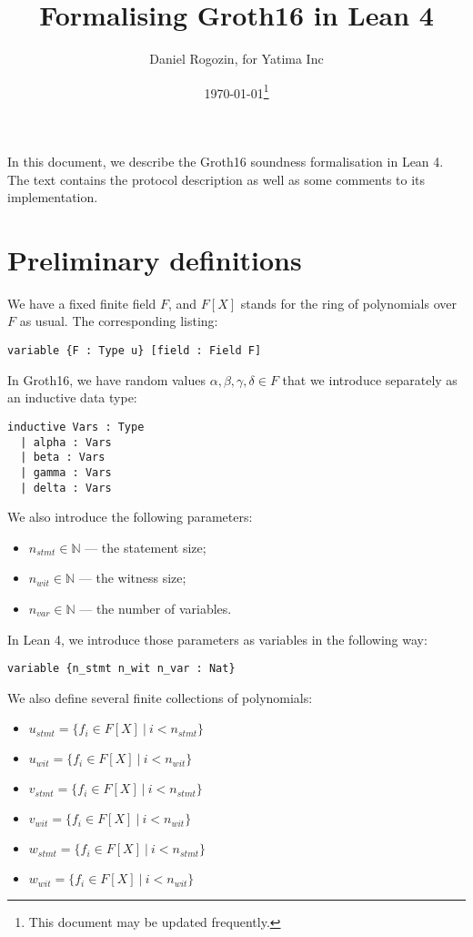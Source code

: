 \documentclass{article}
\title{Formalising Groth16 in Lean 4}
\author{Daniel Rogozin, for Yatima Inc}
\date{\today\footnote{This document may be updated frequently.}}
\theoremstyle{definition}
\theoremstyle{remark}
\begin{document}
\maketitle

In this document, we describe the Groth16 soundness formalisation in Lean 4.
The text contains the protocol description as well as some comments to its implementation.

\section{Preliminary definitions}

We have a fixed finite field $F$, and $F[X]$ stands for the ring of polynomials over $F$ as usual. The corresponding listing:

\begin{lstlisting}
variable {F : Type u} [field : Field F]
\end{lstlisting}

In Groth16, we have random values $\alpha, \beta, \gamma, \delta \in F$ that we introduce separately as an inductive data type:
\begin{lstlisting}
inductive Vars : Type
  | alpha : Vars
  | beta : Vars
  | gamma : Vars
  | delta : Vars
\end{lstlisting}

We also introduce the following parameters:

\begin{itemize}
\item $n_{stmt} \in \mathbb{N}$ --- the statement size;
\item $n_{wit} \in \mathbb{N}$ --- the witness size;
\item $n_{var} \in \mathbb{N}$ --- the number of variables.
\end{itemize}

In Lean 4, we introduce those parameters as variables in the following way:

\begin{lstlisting}
variable {n_stmt n_wit n_var : Nat}
\end{lstlisting}

We also define several finite collections of polynomials:

\begin{itemize}
\item $u_{stmt} = \{ f_{i} \in F[X] \: | \: i < n_{stmt} \}$
\item $u_{wit} = \{ f_{i} \in F[X] \: | \: i < n_{wit} \}$
\item $v_{stmt} = \{ f_{i} \in F[X] \: | \: i < n_{stmt} \}$
\item $v_{wit} = \{ f_{i} \in F[X] \: | \: i < n_{wit} \}$
\item $w_{stmt} = \{ f_{i} \in F[X] \: | \: i < n_{stmt} \}$
\item $w_{wit} = \{ f_{i} \in F[X] \: | \: i < n_{wit} \}$
\end{itemize}
\end{document}
